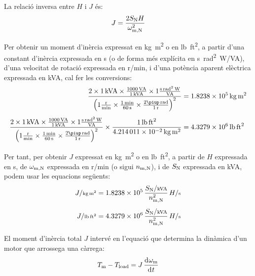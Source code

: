La relació inversa entre $H$ i $J$ és:
\begin{equation}
    J = \frac{2 S\ped{N} H}{\omega\ped{m,N}^2}
\end{equation}

Per  obtenir un moment d'inèrcia expressat en \si{kg.m^2} o en \si{lb.ft^2}, a partir d'una constant d'inèrcia  expressada en \si{s} (o de forma més explícita en \si{s.rad^2.W/VA}), d'una velocitat de rotació expressada en \si{r/min}, i d'una potència aparent elèctrica expressada en \si{kVA}, cal  fer les conversions:
\begin{subequations}
\begin{align}
    \frac{2\times \SI{1}{kVA} \times \frac{\SI{1000}{VA}}{\SI{1}{kVA}} \times 1 \frac{\si{s.rad^2.W}}{\si{VA}}}{\left(1\frac{\si{r}}{\si{min}} \times \frac{\SI{1}{min}}{\SI{60}{s}} \times \frac{2\piup\,\si{rad}}{\SI{1}{r}}\right)^2}  &= \SI{1,8238e5}{kg.m^2} \\[1ex]
    \frac{2\times \SI{1}{kVA} \times \frac{\SI{1000}{VA}}{\SI{1}{kVA}} \times 1 \frac{\si{s.rad^2.W}}{\si{VA}}}{\left(1\frac{\si{r}}{\si{min}} \times \frac{\SI{1}{min}}{\SI{60}{s}} \times \frac{2\piup\,\si{rad}}{\SI{1}{r}}\right)^2}  \times \frac{\SI{1}{lb.ft^2}}{\SI{4,214011e-2}{kg.m^2}} &= \SI{4,3279e6}{lb.ft^2}
\end{align}
\end{subequations}

Per tant, per  obtenir $J$  expressat en \si{kg.m^2} o en \si{lb.ft^2}, a partir de $H$ expressada en \si{s}, de $\omega\ped{m,N}$ expressada en \si{r/min} (o sigui $n\ped{m,N}$), i de $S\ped{N}$ expressada en \si{kVA}, podem usar les equacions següents:
\begin{subequations}
\begin{align}
     J/{\scriptstyle \si{kg.m^2}} &= \num{1,8238e5}\,  \frac{S\ped{N}/{\scriptstyle \si{kVA}}}{n\ped{m,N}^2} \, H/{\scriptstyle \si{s}}\\[1ex]
    J/{\scriptstyle \si{lb.ft^2}} &= \num{4,3279e6}\,  \frac{S\ped{N}/{\scriptstyle \si{kVA}}}{n\ped{m,N}^2} \, H/{\scriptstyle \si{s}}
\end{align}
\end{subequations}

El moment d'inèrcia total $J$ intervé en l'equació que  determina la dinàmica d'un motor que arrossega una càrrega:
\begin{equation}\label{eq:Tm-Tl-vel}
    T\ped{m} - T\ped{load} = J\,\frac{\diff \omega\ped{m}}{\diff t}
\end{equation}


